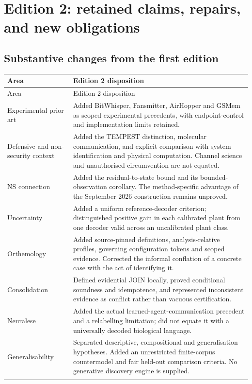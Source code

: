 \Needspace{0.36\textheight}
\section{Edition 2: retained claims, repairs, and new obligations}\label{app:edition}
\subsection{Substantive changes from the first edition}
\begin{longtable}{@{}>{\raggedright\arraybackslash}p{}>{\raggedright\arraybackslash}p{}@{}}
\toprule Area & Edition 2 disposition \\\midrule
\endfirsthead
\toprule Area & Edition 2 disposition \\\midrule
\endhead
Experimental prior art & Added BitWhisper, Fansmitter, AirHopper and GSMem as scoped experimental precedents, with endpoint-control and implementation limits retained. \\\addlinespace
Defensive and non-security context & Added the TEMPEST distinction, molecular communication, and explicit comparison with system identification and physical computation. Channel science and unauthorised circumvention are not equated. \\\addlinespace
NS connection & Added the residual-to-state bound and its bounded-observation corollary. The method-specific advantage of the September 2026 construction remains unproved. \\\addlinespace
Uncertainty & Added a uniform reference-decoder criterion; distinguished positive gain in each calibrated plant from one decoder valid across an uncalibrated plant class. \\\addlinespace
Orthemology & Added source-pinned definitions, analysis-relative profiles, governing configuration tokens and scoped evidence. Corrected the informal conflation of a concrete case with the act of identifying it. \\\addlinespace
Consolidation & Defined evidential JOIN locally, proved conditional soundness and idempotence, and represented inconsistent evidence as conflict rather than vacuous certification. \\\addlinespace
Neuralese & Added the actual learned-agent-communication precedent and a relabelling limitation; did not equate it with a universally decoded biological language. \\\addlinespace
Generalisability & Separated descriptive, compositional and generalisation hypotheses. Added an unrestricted finite-corpus countermodel and fair held-out comparison criteria. No generative discovery engine is supplied. \\\addlinespace

\end{longtable}

